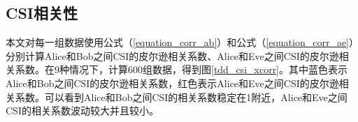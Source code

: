 \documentclass[master]{seuthesis} %
\begin{document}
\begin{Main}
\subsection{CSI相关性}

本文对每一组数据使用公式（\ref{equation_corr_ab}）和公式（\ref{equation_corr_ae}）分别计算Alice和Bob之间CSI的皮尔逊相关系数、Alice和Eve之间CSI的皮尔逊相关系数。在9种情况下，计算600组数据，得到图\ref{tdd_csi_xcorr}。其中蓝色表示Alice和Bob之间CSI的皮尔逊相关系数，红色表示Alice和Eve之间CSI的皮尔逊相关系数。可以看到Alice和Bob之间CSI的相关系数稳定在1附近，Alice和Eve之间CSI的相关系数波动较大并且较小。

\begin{figure}
    \centering
    \quad    %
    \subfigure[走廊-方式3]{
}
\end{figure}
\end{Main}
\end{document}

